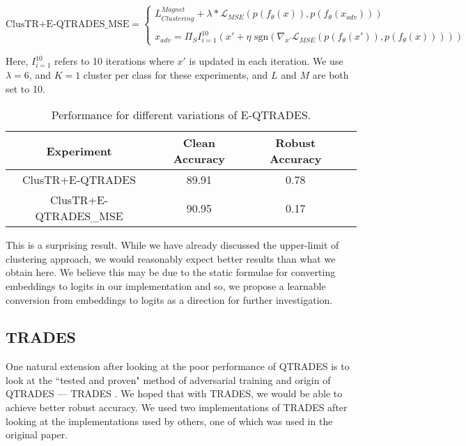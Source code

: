 \[\text{ClusTR+E-QTRADES\_MSE} = \begin{cases}L^{Magnet}_{Clustering} + \lambda*\mathcal{L}_{MSE}(p(f_{\theta}(x)), p(f_{\theta}(x_{adv})))\\
\\
x_{adv} = \Pi_{S}I_{i=1}^{10}(x' + \eta \text{ sgn}(\nabla_{x'}\mathcal{L}_{MSE}(p(f_{\theta}(x')), p(f_{\theta}(x)))))\end{cases}\]

Here, $I_{i=1}^{10}$ refers to 10 iterations where $x'$ is updated in each iteration. We use $\lambda = 6$, and $K=1$ cluster per class for these experiments, and $L$ and $M$ are both set to 10. 

\begin{table}[h!]
    \centering
    \begin{tabular}{|c|c|c|c|}
    \hline
        \textbf{Experiment} & \textbf{Clean Accuracy} & \textbf{Robust Accuracy} \\
        \hline
        ClusTR+E-QTRADES & 89.91 & 0.78 \\
        ClusTR+E-QTRADES\_MSE & 90.95 & 0.17 \\
        \hline
     \end{tabular}
    \caption{Performance for different variations of E-QTRADES.}
    \label{tab:eqtrades}
\end{table}

\noindent This is a surprising result. While we have already discussed the upper-limit of clustering approach, we would reasonably expect better results than what we obtain here. We believe this may be due to the static formulae for converting embeddings to logits in our implementation and so, we propose a learnable conversion from embeddings to logits as a direction for further investigation.

\subsection{TRADES}
One natural extension after looking at the poor performance of QTRADES is to look at the ``tested and proven" method of adversarial training and origin of QTRADES —  TRADES \cite{Zhang2019TRADES}. We hoped that with TRADES, we would be able to achieve better robust accuracy. We used two implementations of TRADES after looking at the implementations used by others, one of which was used in the original paper.

